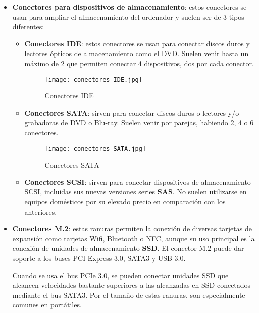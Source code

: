 \begin{itemize}
    \begin{itemize}
        \item \textbf{Conectores para dispositivos de almacenamiento}: estos conectores se usan para ampliar el almacenamiento del ordenador y suelen ser de 3 tipos diferentes:

        \begin{itemize}
            \item \textbf{Conectores IDE}: estos conectores se usan para conectar discos duros y lectores ópticos de almacenamiento como el DVD. Suelen venir hasta un máximo de 2 que permiten conectar 4 dispositivos, dos por cada conector.

            \begin{figure}[H]
                \centering
                \texttt{[image: conectores-IDE.jpg]}
                \caption{Conectores IDE}
            \end{figure}

            \item \textbf{Conectores SATA}: sirven para conectar discos duros o lectores y/o grabadoras de DVD o Blu-ray. Suelen venir por parejas, habiendo 2, 4 o 6 conectores.

            \begin{figure}[H]
                \centering
                \texttt{[image: conectores-SATA.jpg]}
                \caption{Conectores SATA}
            \end{figure}

            \item \textbf{Conectores SCSI}: sirven para conectar dispositivos de almacenamiento SCSI, incluidas sus nuevas versiones series \textbf{SAS}. No suelen utilizarse en equipos domésticos por su elevado precio en comparación con los anteriores.
        \end{itemize}

    \item \textbf{Conectores M.2}: estas ranuras permiten la conexión de diversas tarjetas de expansión como tarjetas Wifi, Bluetooth o NFC, aunque su uso principal es la conexión de unidades de almacenamiento \textbf{SSD}. El conector M.2 puede dar soporte a los buses PCI Express 3.0, SATA3 y USB 3.0.

    Cuando se usa el bus PCIe 3.0, se pueden conectar unidades SSD que alcancen velocidades bastante superiores a las alcanzadas en SSD conectados mediante el bus SATA3. Por el tamaño de estas ranuras, son especialmente comunes en portátiles.


\end{itemize}
\end{itemize}
